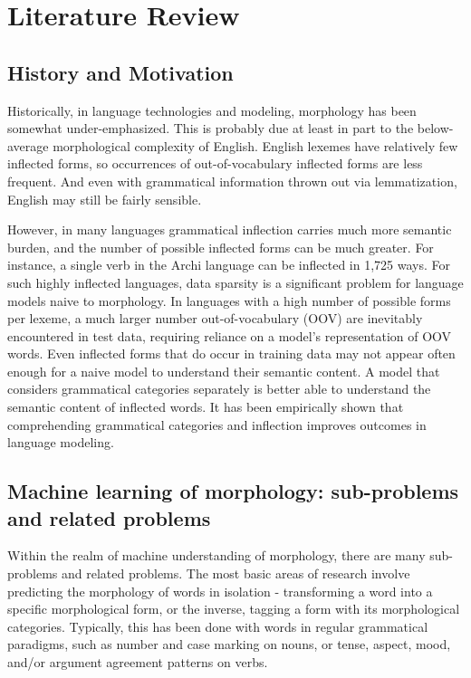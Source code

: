 \chapter{Literature Review}

\section{History and Motivation}

Historically, in language technologies and modeling, morphology has been somewhat under-emphasized. This is probably due at least in part to the below-average morphological complexity of English. \parencite{Cotterell2017} English lexemes have relatively few inflected forms, so occurrences of out-of-vocabulary inflected forms are less frequent. And even with grammatical information thrown out via lemmatization, English may still be fairly sensible.

However, in many languages grammatical inflection carries much more semantic burden, and the number of possible inflected forms can be much greater. For instance, a single verb in the Archi language can be inflected in 1,725 ways. \parencite{Cotterell2016} For such highly inflected languages, data sparsity is a significant problem for language models naive to morphology. In languages with a high number of possible forms per lexeme, a much larger number out-of-vocabulary (OOV) are inevitably encountered in test data, requiring reliance on a model's representation of OOV words. Even inflected forms that do occur in training data may not appear often enough for a naive model to understand their semantic content. A model that considers grammatical categories separately is better able to understand the semantic content of inflected words. \parencite{Cotterell2016} It has been empirically shown that comprehending grammatical categories and inflection improves outcomes in language modeling. \parencite{Faruqui2015}

\section{Machine learning of morphology: sub-problems and related problems}

Within the realm of machine understanding of morphology, there are many sub-problems and related problems. The most basic areas of research involve predicting the morphology of words in isolation - transforming a word into a specific morphological form, or the inverse, tagging a form with its morphological categories. Typically, this has been done with words in regular grammatical paradigms, such as number and case marking on nouns, or tense, aspect, mood, and/or argument agreement patterns on verbs. 

